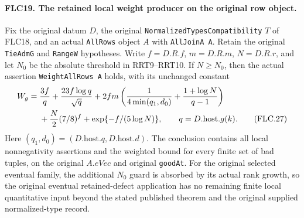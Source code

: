 \paragraph{FLC19. The retained local weight producer on the original row object.}
\label{claim:FLC19}
Fix the original datum $D$, the original
\texttt{NormalizedTypesCompatibility} $T$ of FLC18, and an
actual \texttt{AllRows} object $A$ with
\texttt{AllJoinA A}.  Retain the original
\texttt{TieAdmG} and \texttt{RangeW} hypotheses.
Write $f=D.R.f$, $m=D.R.m$, $N=D.R.r$, and let $N_0$ be the
absolute threshold in RRT9--RRT10.  If $N\ge N_0$, then the
actual assertion \texttt{WeightAllRows A} holds, with its
unchanged constant
\begin{align}
 W_g={}&\frac{3f}{q}+\frac{23f\log q}{\sqrt q}
       +2fm\left(\frac1{4\min(q_1,d_0)}
                     +\frac{1+\log N}{q-1}\right)\notag\\
     &+\frac N2(7/8)^f+\exp\{-f/(5\log N)\},
       \qquad q=D.\mathrm{host}.g(k).
 \tag{FLC.27}
\end{align}
Here $(q_1,d_0)=(D.\mathrm{host}.q,D.\mathrm{host}.d)$.
The conclusion contains all local nonnegativity assertions
and the weighted bound for every finite set of bad tuples,
on the original $A.eVec$ and original \texttt{goodAt}.
For the original selected eventual family, the additional
$N_0$ guard is absorbed by its actual rank growth, so the
original eventual retained-defect application has no
remaining finite local quantitative input beyond the stated
published theorem and the original supplied normalized-type
record.
